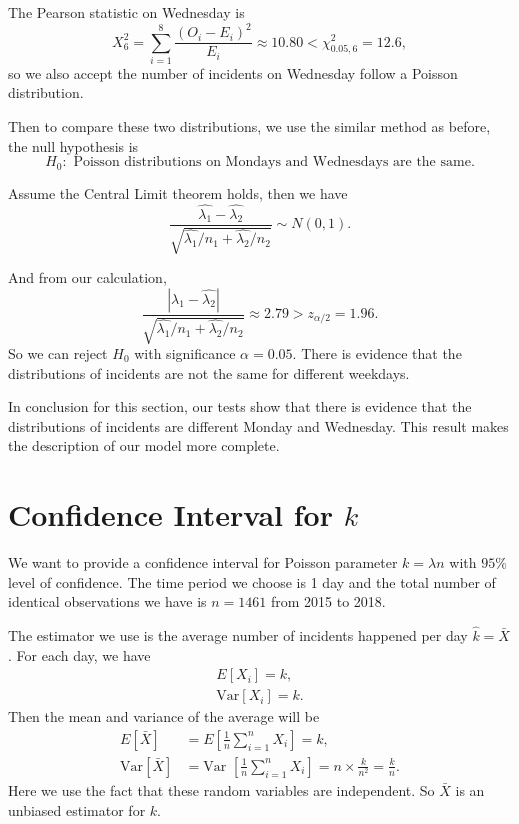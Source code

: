\documentclass[11pt,a4paper,english]{article}
\begin{document}
The Pearson statistic on Wednesday is 
\begin{equation*}
	X^{2}_{6} = \sum_{i = 1}^{8}\frac{(O_{i}-E_{i})^{2}}{E_{i}} \approx 10.80 < \chi^{2}_{0.05,6} = 12.6,
\end{equation*}
so we also accept the number of incidents on Wednesday follow a Poisson distribution.

Then to compare these two distributions, we use the similar method as before, the null hypothesis is 
\begin{equation*}
	H_{0}:\text{ Poisson distributions on Mondays and Wednesdays are the same.}
\end{equation*}

Assume the Central Limit theorem holds, then we have
\begin{equation*}
	\frac{\hat{\lambda_{1}}-\hat{\lambda_{2}}}{\sqrt{\hat{\lambda_{1}}/{n_{1}} + \hat{\lambda_{2}}/{n_{2}}}} \sim N(0,1).
\end{equation*}

And from our calculation,
\begin{equation*}
	\frac{|\hat{\lambda_{1}}-\hat{\lambda_{2}}|}{\sqrt{\hat{\lambda_{1}}/{n_{1}} + \hat{\lambda_{2}}/{n_{2}}}} \approx 2.79 > z_{\alpha/2} = 1.96.
\end{equation*}
So we can reject $H_{0}$ with significance $\alpha = 0.05$. There is evidence that the distributions of incidents are not the same for different weekdays.

In conclusion for this section, our tests show that there is evidence that the distributions of incidents are different Monday and Wednesday. This result makes the description of our model more complete.
\section{Confidence Interval for $k$}
We want to provide a confidence interval for Poisson parameter $k = \lambda n$ with $95\%$ level of confidence. 
The time period we choose is 1 day and the total number of identical observations we have is $n = 1461$ from 2015 to 2018.

The estimator we use is the average number of incidents happened per day $\hat{k} = \bar{X}$.
For each day, we have 
\begin{align*}
	E[X_{i}] = k,\\
	\text{Var}[X_{i}] = k.
\end{align*}
Then the mean and variance of the average will be
\begin{align*}
	E[\bar{X}] &= E[\frac{1}{n}\sum_{i = 1}^{n}X_{i}] = k,\\
	\text{Var}[\bar{X}] &= \text{Var }[\frac{1}{n}\sum_{i = 1}^{n}X_{i}] = n \times \frac{k}{n^{2}} = \frac{k}{n}.
\end{align*}
Here we use the fact that these random variables are independent. So $\bar{X}$ is an unbiased estimator for $k$.
\end{document}
